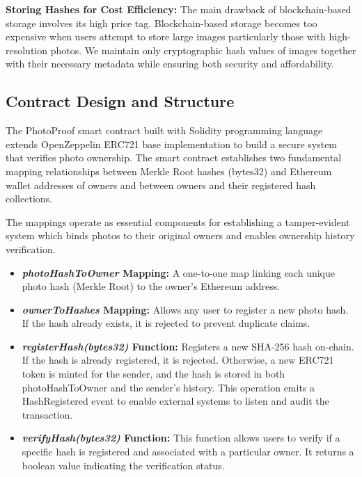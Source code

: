\textbf{Storing Hashes for Cost Efficiency: }
The main drawback of blockchain-based storage involves its high price tag. Blockchain-based storage becomes too expensive when users attempt to store large images particularly those with high-resolution photos. We maintain only cryptographic hash values of images together with their necessary metadata while ensuring both security and affordability.


\subsection{Contract Design and Structure}
The PhotoProof smart contract built with Solidity programming language extends OpenZeppelin ERC721 base implementation to build a secure system that verifies photo ownership. The smart contract establishes two fundamental mapping relationships between Merkle Root hashes (bytes32) and Ethereum wallet addresses of owners and between owners and their registered hash collections.

The mappings operate as essential components for establishing a tamper-evident system which binds photos to their original owners and enables ownership history verification.



\begin{itemize}
    \item {\textbf{\textit{photoHashToOwner} Mapping: }} A one-to-one map linking each unique photo hash (Merkle Root) to the owner's Ethereum address.
    \item {\textbf{\textit{ownerToHashes} Mapping: }} Allows any user to register a new photo hash. If the hash already exists, it is rejected to prevent duplicate claims.
    \item {\textbf{\textit{registerHash(bytes32)} Function: }} Registers a new SHA-256 hash on-chain. If the hash is already registered, it is rejected. Otherwise, a new ERC721 token is minted for the sender, and the hash is stored in both photoHashToOwner and the sender’s history. This operation emits a HashRegistered event to enable external systems to listen and audit the transaction.
    \item {\textbf{\textit{verifyHash(bytes32)} Function: }} This function allows users to verify if a specific hash is registered and associated with a particular owner. It returns a boolean value indicating the verification status.
\end{itemize}

